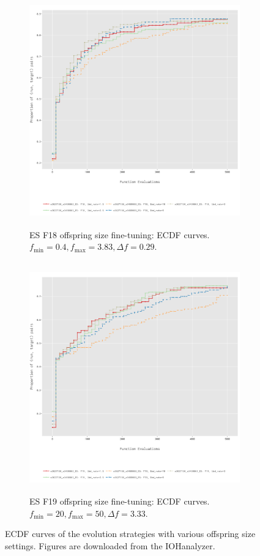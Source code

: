 \documentclass{article}
\begin{document}
\begin{figure}[!ht]
    \centering
    \begin{subfigure}[h]{0.95\linewidth}
        \includegraphics[width=\linewidth, height=10cm]{es/f18/ECDF18lbd.png}
        \caption{ES F18 offspring size fine-tuning: ECDF curves. $f_{\min} = 0.4, f_{\max} = 3.83, \Delta f = 0.29$.}
    \end{subfigure}
    \hfill
    \begin{subfigure}[h]{0.95\linewidth}
        \includegraphics[width=\linewidth, height=10cm]{es/f19/ECDF19lbd.png}
        \caption{ES F19 offspring size fine-tuning: ECDF curves. $f_{\min} = 20, f_{\max} = 50, \Delta f = 3.33$.}
    \end{subfigure}
    \caption{ECDF curves of the evolution strategies with various offspring size settings. Figures are downloaded from the IOHanalyzer.}
    \label{fig:experi-es-osize-ecdf}
\end{figure}
\end{document}
